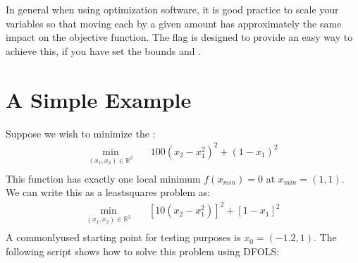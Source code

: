 \documentclass[letterpaper,10pt,english]{sphinxmanual}
\begin{document}
In general when using optimization software, it is good practice to scale your variables so that moving each by a given amount has approximately the same impact on the objective function.
The  flag is designed to provide an easy way to achieve this, if you have set the bounds  and .


\section{A Simple Example}
\label{\detokenize{userguide:a-simple-example}}
Suppose we wish to minimize the :
\begin{equation*}
\begin{split}\min_{(x_1,x_2)\in\mathbb{R}^2}  &\quad  100(x_2-x_1^2)^2 + (1-x_1)^2 \\\end{split}
\end{equation*}
This function has exactly one local minimum \(f(x_{min})=0\) at \(x_{min}=(1,1)\). We can write this as a least\sphinxhyphen{}squares problem as:
\begin{equation*}
\begin{split}\min_{(x_1,x_2)\in\mathbb{R}^2}  &\quad  [10(x_2-x_1^2)]^2 + [1-x_1]^2 \\\end{split}
\end{equation*}
A commonly\sphinxhyphen{}used starting point for testing purposes is \(x_0=(-1.2,1)\). The following script shows how to solve this problem using DFO\sphinxhyphen{}LS:
\end{document}
